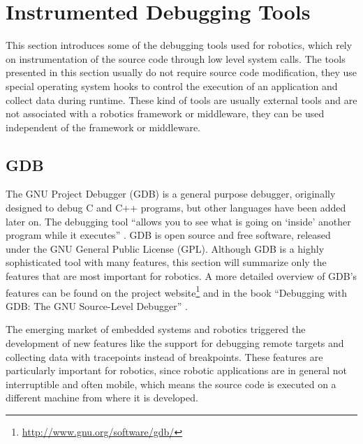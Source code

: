 
\section{Instrumented Debugging Tools}
This section introduces some of the debugging tools used for robotics, which rely on instrumentation of the source code through low level system calls. The tools presented in this section usually do not require source code modification, they use special operating system hooks to control the execution of an application and collect data during runtime. These kind of tools are usually external tools and are not associated with a robotics framework or middleware, they can be used independent of the framework or middleware.

\subsection{GDB}
The GNU Project Debugger (GDB) is a general purpose debugger, originally designed to debug C and C++ programs, but other languages have been added later on. The debugging tool ``allows you to see what is going on `inside' another program while it executes'' \cite{Stallman2002}. GDB is open source and free software, released under the GNU General Public License (GPL). Although GDB is a highly sophisticated tool with many features, this section will summarize only the features that are most important for robotics. A more detailed overview of GDB's features can be found on the project website\footnote{\url{http://www.gnu.org/software/gdb/}} and in the book ``Debugging with GDB: The GNU Source-Level Debugger'' \cite{Stallman2002}.

The emerging market of embedded systems and robotics triggered the development of new features like the support for debugging remote targets and collecting data with tracepoints instead of breakpoints. These features are particularly important for robotics, since robotic applications are in general not interruptible and often mobile, which means the source code is executed on a different machine from where it is developed.

